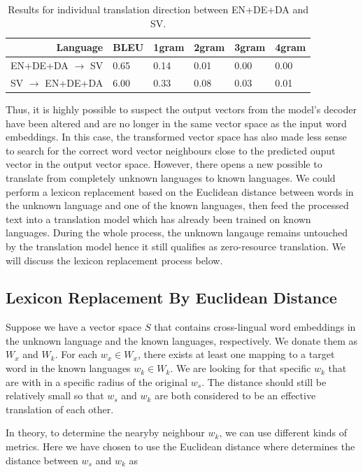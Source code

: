 \documentclass[thesis,fonts=libertine]{cluu}
\begin{document}
\begin{table}
  \centering
  \begin{tabular}{|r*{5}{|l}|}
  \hline
  Language & BLEU & 1gram & 2gram & 3gram & 4gram \\ [0.25ex]
  \hline\hline
  EN+DE+DA $\rightarrow$ SV & 0.65 & 0.14 & 0.01 & 0.00 & 0.00 \\
  \hline
  SV $\rightarrow$ EN+DE+DA & 6.00 & 0.33 & 0.08 & 0.03 & 0.01 \\
  \hline
  \end{tabular}
  \caption{Results for individual translation direction between EN+DE+DA and SV.}
  \label{table:directional_results}
\end{table}

Thus, it is highly possible to suspect the output vectors from the model's decoder have been altered and are no longer in the same vector space as the input word embeddings. In this case, the transformed vector space has also made less sense to search for the correct word vector neighbours close to the predicted ouput vector in the output vector space. However, there opens a new possible to translate from completely unknown languages to known languages. We could perform a lexicon replacement based on the Euclidean distance between words in the unknown language and one of the known languages, then feed the processed text into a translation model which has already been trained on known languages. During the whole process, the unknown langauge remains untouched by the translation model hence it still qualifies as zero-resource translation. We will discuss the lexicon replacement process below.

\subsection{Lexicon Replacement By Euclidean Distance}

Suppose we have a vector space $S$ that contains cross-lingual word embeddings in the unknown language and the known languages, respectively. We donate them as $W_x$ and $W_k$. For each $w_x\in W_x$, there exists at least one mapping to a target word in the known languages $w_k \in W_k$. We are looking for that specific $w_k$ that are with in a specific radius of the original $w_s$. The distance should still be relatively small so that $w_s$ and $w_k$ are both considered to be an effective translation of each other.

In theory, to determine the nearyby neighbour $w_k$, we can use different kinds of metrics. Here we have chosen to use the Euclidean distance where determines the distance between $w_s$ and $w_k$ as
\end{document}
